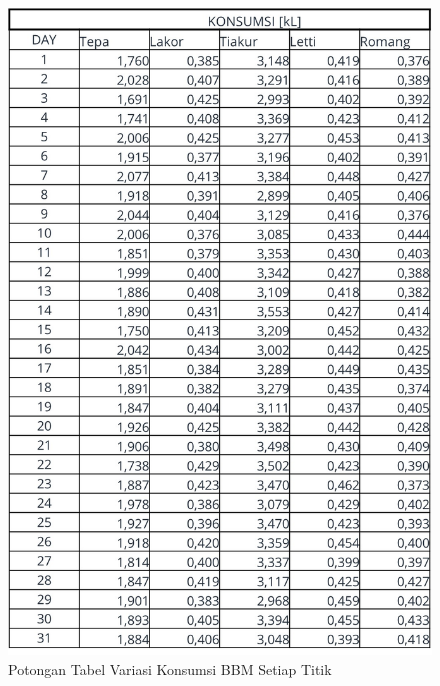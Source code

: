 \begin{figure}[!ht]
    \centering
    \includegraphics[width=0.95\linewidth,height=0.95\textheight,keepaspectratio]{lampiran/tabel-konsumsi-simu.jpg}
    \caption*{Potongan Tabel Variasi Konsumsi BBM Setiap Titik}
\end{figure}

